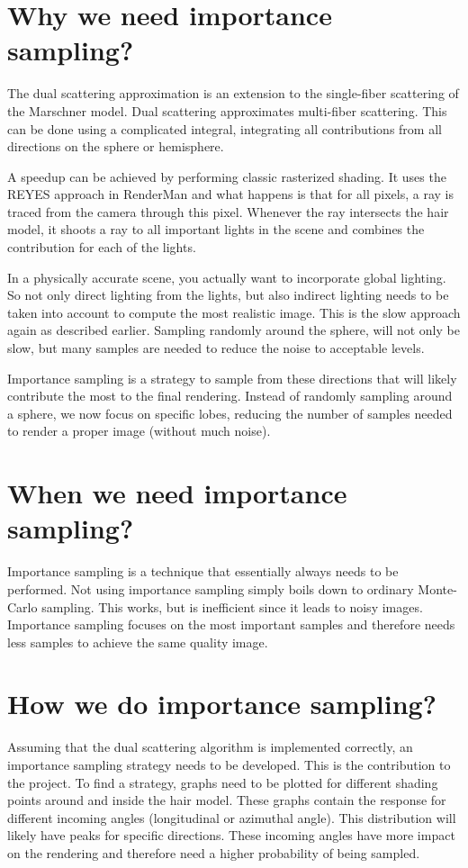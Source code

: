 \documentclass[11pt,a4paper]{article}
\begin{document}
\section{Why we need importance sampling?}
The dual scattering approximation is an extension to the single-fiber scattering of the Marschner model. Dual scattering approximates multi-fiber scattering. This can be done using a complicated integral, integrating all contributions from all directions on the sphere or hemisphere.

A speedup can be achieved by performing classic rasterized shading. It uses the REYES approach in RenderMan and what happens is that for all pixels, a ray is traced from the camera through this pixel. Whenever the ray intersects the hair model, it shoots a ray to all important lights in the scene and combines the contribution for each of the lights.

In a physically accurate scene, you actually want to incorporate global lighting. So not only direct lighting from the lights, but also indirect lighting needs to be taken into account to compute the most realistic image. This is the slow approach again as described earlier. Sampling randomly around the sphere, will not only be slow, but many samples are needed to reduce the noise to acceptable levels.

Importance sampling is a strategy to sample from these directions that will likely contribute the most to the final rendering. Instead of randomly sampling around a sphere, we now focus on specific lobes, reducing the number of samples needed to render a proper image (without much noise).

\section{When we need importance sampling?}

Importance sampling is a technique that essentially always needs to be performed. Not using importance sampling simply boils down to ordinary Monte-Carlo sampling. This works, but is inefficient since it leads to noisy images. Importance sampling focuses on the most important samples and therefore needs less samples to achieve the same quality image.

\section{How we do importance sampling?}

Assuming that the dual scattering algorithm is implemented correctly, an importance sampling strategy needs to be developed. This is the contribution to the project. To find a strategy, graphs need to be plotted for different shading points around and inside the hair model. These graphs contain the response for different incoming angles (longitudinal or azimuthal angle). This distribution will likely have peaks for specific directions. These incoming angles have more impact on the rendering and therefore need a higher probability of being sampled. 
\end{document}
